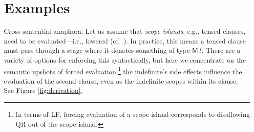 \section{Examples}
	Cross-sentential anaphora. Let us assume that \emph{scope islands}, e.g., tensed clauses, need to be evaluated---i.e., lowered (cf.~\citealt{Barker:2002, BarkerShan:2008}). In practice, this means a tensed clause must pass through a stage where it denotes something of type $\textsf{M}\,t$. There are a variety of options for enforcing this syntactically, but here we concentrate on the semantic upshots of forced evaluation.\footnote{In terms of LF, forcing evaluation of a scope island corresponds to disallowing QR out of the scope island.} the indefinite's side effects influence the evaluation of the second clause, even as the indefinite scopes within its clause. See Figure \ref{fig:derivation}.%
